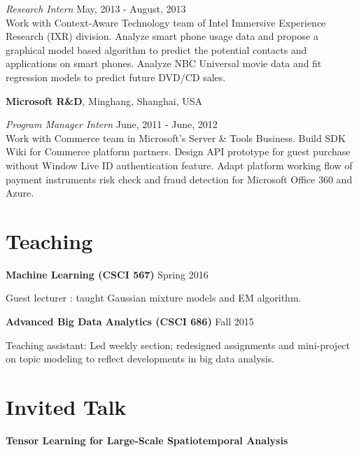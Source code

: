 \documentclass[margin,line]{res}
\begin{document}
\begin{resume}
\vspace{-.3cm}
{\em Research Intern} \hfill { May, 2013 - August, 2013}\\
Work with Context-Aware Technology team of Intel Immersive Experience Research (IXR) division. 
Analyze smart phone usage data and propose a graphical model based algorithm to predict the potential contacts and applications on smart phones.
Analyze NBC Universal movie data and fit regression models to predict future DVD/CD sales.

{\bf  Microsoft R\&D}, Minghang, Shanghai, USA

\vspace{-.3cm}
{\em Program Manager Intern} \hfill {June, 2011 
- June, 2012}\\
 Work with Commerce team in Microsoft’s Server \& Tools Business.
 Build SDK Wiki for Commerce platform partners.  
 Design API prototype for guest purchase without Window Live ID authentication feature.
Adapt platform working flow of payment instruments risk check and fraud detection for Microsoft Office 360 and Azure.


\section{\sc Teaching }
 {\bf Machine Learning (CSCI 567)}   \hfill  { Spring 2016 } 
 
 \vspace{-.3cm}
 Guest  lecturer : taught Gaussian mixture models and EM algorithm.
 
 
 {\bf Advanced Big Data Analytics (CSCI 686)}   \hfill  {Fall 2015} 
 
 \vspace{-.3cm}
Teaching assistant: Led weekly section; redesigned assignments and mini-project on topic modeling to reflect developments in big data analysis. 


\section{\sc Invited Talk}
{\bf Tensor Learning for Large-Scale Spatiotemporal Analysis}
\vspace{-.3cm}


\end{resume}
\end{document}
